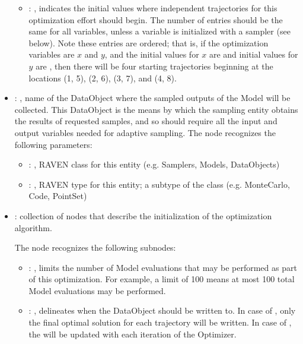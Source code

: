 \begin{itemize}
\begin{itemize}
        \item {}: ,
          indicates the initial values where independent trajectories for this optimization
          effort should begin. The number of entries should be the same for all variables, unless
          a variable is initialized with a sampler (see  below). Note these
          entries are ordered; that is, if the optimization variables are $x$ and $y$, and the
          initial               values for $x$ are  and initial values for $y$
          are ,               then there will be four starting trajectories
          beginning at the locations (1, 5), (2, 6),               (3, 7), and (4, 8).
      \end{itemize}

    \item {}: ,
      name of the DataObject where the sampled outputs of the Model will be collected.
      This DataObject is the means by which the sampling entity obtains the results of requested
      samples, and so should require all the input and output variables needed for adaptive
      sampling.
      The  node recognizes the following parameters:
        \begin{itemize}
          \item {}: ,
            RAVEN class for this entity (e.g. Samplers, Models, DataObjects)
          \item {}: ,
            RAVEN type for this entity; a subtype of the class (e.g. MonteCarlo, Code, PointSet)
      \end{itemize}

    \item {}:
      collection of nodes that describe the initialization of the optimization algorithm.

      The  node recognizes the following subnodes:
      \begin{itemize}
        \item {}: ,
          limits the number of Model evaluations that may be performed as part of this optimization.
          For example, a limit of 100 means at most 100 total Model evaluations may be performed.

        \item {}: ,
          delineates when the  DataObject should be written to. In case
          of , only the final optimal solution for each trajectory will be written.
          In case of , the  will be updated with each
          iteration               of the Optimizer.


\end{itemize}
\end{itemize}

